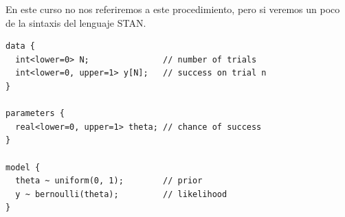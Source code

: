 \documentclass[
  12pt,
]{book}
\newenvironment{Shaded}{\begin{snugshade}}{\end{snugshade}}
\newcommand{\AttributeTok}[1]{\textcolor[rgb]{0.77,0.63,0.00}{#1}}
\newcommand{\DecValTok}[1]{\textcolor[rgb]{0.00,0.00,0.81}{#1}}
\newcommand{\FunctionTok}[1]{\textcolor[rgb]{0.00,0.00,0.00}{#1}}
\newcommand{\NormalTok}[1]{#1}
\newcommand{\OtherTok}[1]{\textcolor[rgb]{0.56,0.35,0.01}{#1}}
\newcommand{\SpecialCharTok}[1]{\textcolor[rgb]{0.00,0.00,0.00}{#1}}
\theoremstyle{definition}
\theoremstyle{definition}
\theoremstyle{definition}
\theoremstyle{remark}
\begin{document}
En este curso no nos referiremos a este procedimiento, pero si veremos un poco de la sintaxis del lenguaje STAN.

\begin{verbatim}
data {
  int<lower=0> N;               // number of trials
  int<lower=0, upper=1> y[N];   // success on trial n
}

parameters {
  real<lower=0, upper=1> theta; // chance of success
}

model {
  theta ~ uniform(0, 1);        // prior
  y ~ bernoulli(theta);         // likelihood
}
\end{verbatim}

\begin{Shaded}
\end{Shaded}
\end{document}
